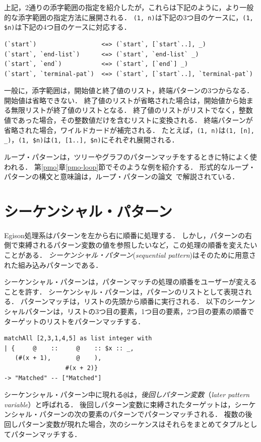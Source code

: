 上記，2通りの添字範囲の指定を紹介したが，これらは下記のように，より一般的な添字範囲の指定方法に展開される．
\lstinline{(1, n)}は下記の3つ目のケースに，\lstinline{(1, $n)}は下記の4つ目のケースに対応する．
\begin{lstlisting}[language=egison,numbers=none]
(`start`)                  <=> (`start`, [`start`..], _)
(`start`, `end-list`)      <=> (`start`, `end-list` _)
(`start`, `end`)           <=> (`start`, [`end`] _)
(`start`, `terminal-pat`)  <=> (`start`, [`start`..], `terminal-pat`)
\end{lstlisting}
一般に，添字範囲は，開始値と終了値のリスト，終端パターンの3つからなる．
開始値は省略できない．
終了値のリストが省略された場合は，開始値から始まる無限リストが終了値のリストとなる．
終了値のリストがリストでなく，整数値であった場合，その整数値だけを含むリストに変換される．
終端パターンが省略された場合，ワイルドカードが補完される．
たとえば，\lstinline{(1, n)}は\lstinline{(1, [n], _)}，\lstinline{(1, $n)}は\lstinline{(1, [1..], $n)}にそれぞれ展開される．

ループ・パターンは，ツリーやグラフのパターンマッチをするときに特によく使われる．
第\ref{pmo}章\ref{pmo-loop}節でそのような例を紹介する．
形式的なループ・パターンの構文と意味論は，ループ・パターンの論文~\cite{egi2018loop}で解説されている．

\section{シーケンシャル・パターン}\label{quick-seq-pat}

Egison処理系はパターンを左から右に順番に処理する．
しかし，パターンの右側で束縛されるパターン変数の値を参照したいなど，この処理の順番を変えたいことがある．
\emph{シーケンシャル・パターン}(\emph{sequential pattern})はそのために用意された組み込みパターンである．

シーケンシャル・パターンは，パターンマッチの処理の順番をユーザーが変えることを許す．
シーケンシャル・パターンは，パターンのリストとして表現される．
パターンマッチは，リストの先頭から順番に実行される．
以下のシーケンシャルパターンは，リストの3つ目の要素，1つ目の要素，2つ目の要素の順番でターゲットのリストをパターンマッチする．
\begin{lstlisting}[language=egison,numbers=none]
matchAll [2,3,1,4,5] as list integer with
| {     @    ::     @    :: $x :: _,
   (#(x + 1),       @    ),
                 #(x + 2)}
-> "Matched" -- ["Matched"]
\end{lstlisting}
シーケンシャル・パターン中に現れる\lstinline|@|は，\emph{後回しパターン変数}（\emph{later pattern variable}）と呼ばれる．
後回しパターン変数に束縛されたターゲットは，シーケンシャル・パターンの次の要素のパターンでパターンマッチされる．
複数の後回しパターン変数が現れた場合，次のシーケンスはそれらをまとめてタプルとしてパターンマッチする．

